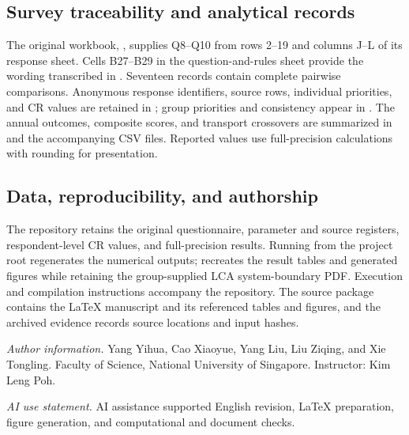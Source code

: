 \documentclass[11pt,a4paper]{article}
\begin{document}
\subsection{Survey traceability and analytical records}
The original workbook, , supplies Q8--Q10 from rows 2--19 and columns J--L of its response sheet. Cells B27--B29 in the question-and-rules sheet provide the wording transcribed in . Seventeen records contain complete pairwise comparisons. Anonymous response identifiers, source rows, individual priorities, and CR values are retained in ; group priorities and consistency appear in . The annual outcomes, composite scores, and transport crossovers are summarized in  and the accompanying CSV files. Reported values use full-precision calculations with rounding for presentation.

\subsection{Data, reproducibility, and authorship}
The repository retains the original questionnaire, parameter and source registers, respondent-level CR values, and full-precision results. Running  from the project root regenerates the numerical outputs;  recreates the result tables and generated figures while retaining the group-supplied LCA system-boundary PDF. Execution and compilation instructions accompany the repository. The source package contains the LaTeX manuscript and its referenced tables and figures, and the archived evidence records source locations and input hashes.

\textit{Author information.} Yang Yihua, Cao Xiaoyue, Yang Liu, Liu Ziqing, and Xie Tongling. Faculty of Science, National University of Singapore. Instructor: Kim Leng Poh.

\textit{AI use statement.} AI assistance supported English revision, LaTeX preparation, figure generation, and computational and document checks.
\end{document}
